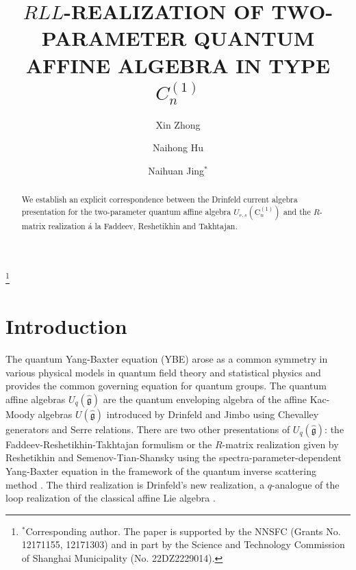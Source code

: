 \documentclass[10pt,a4paper]{amsart}
\numberwithin{equation}{section}
\begin{document}
	
	\title[$RLL$-REALIZATION OF TWO-PARAMETER QUANTUM
	AFFINE ALGEBRA IN TYPE $C_n^{(1)}$]{$RLL$-REALIZATION OF TWO-PARAMETER QUANTUM AFFINE ALGEBRA IN TYPE $C_n^{(1)}$}
	
	\author[X. Zhong]{Xin Zhong}
	\address{School of Mathematical Sciences, MOE Key Laboratory of Mathematics and Engineering Applications \& Shanghai Key Laboratory of PMMP, East China Normal University, Shanghai 200241, China}
		
	\author[N. Hu]{Naihong Hu}
	\address{School of Mathematical Sciences, MOE Key Laboratory of Mathematics and Engineering Applications \& Shanghai Key Laboratory of PMMP, East China Normal University, Shanghai 200241, China}
	
\author[N. Jing]{Naihuan Jing$^*$}
\address{Department of Mathematics, North Carolina State University, Raleigh, NC 27695, USA}
	
	\thanks{$^*$Corresponding author.
		The paper is supported by the NNSFC (Grants No.
		12171155, 12171303) and in part by the Science and Technology Commission of Shanghai Municipality (No. 22DZ2229014).}
	\begin{abstract}
		We establish an explicit correspondence  between the Drinfeld current algebra presentation for
		the two-parameter quantum affine algebra $U_{r, s}(\mathrm{C}_n^{(1)})$ and the $R$-matrix realization \'a la Faddeev, Reshetikhin and Takhtajan.
	\end{abstract}
	
	\maketitle
	
	
	\section{Introduction}
The quantum Yang-Baxter equation (YBE) arose as a common symmetry in various physical models in quantum field theory and statistical physics \cite{B, Y} and provides
the common governing equation for quantum groups. The quantum affine algebras $U_q(\widehat{\mathfrak{g}})$ are the quantum enveloping algebra of
the affine Kac-Moody algebras $U(\widehat{\mathfrak g})$ introduced by Drinfeld and Jimbo using Chevalley generators and Serre relations. There are two other
presentations of $U_q(\widehat{\mathfrak{g}})$: the Faddeev-Reshetikhin-Takhtajan formulism or the $R$-matrix realization given by
Reshetikhin and Semenov-Tian-Shansky \cite{RS}
using the spectra-parameter-dependent Yang-Baxter equation in the framework of the quantum inverse scattering method \cite{FRT, TF}. %
The third realization is Drinfeld's new realization, a $q$-analogue of the loop realization of the classical affine Lie algebra \cite{D}.
\end{document}
